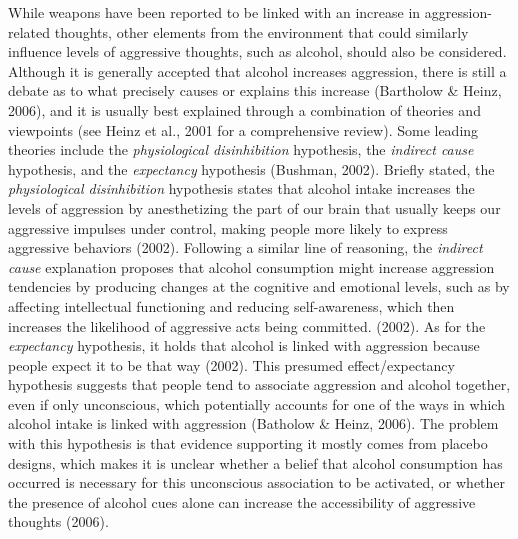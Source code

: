 \documentclass[authordate, serif, review]{jote-article}
\begin{document}
\begin{multicols}{2}
While weapons have been reported to be linked with an increase in aggression-related thoughts, other elements from the environment that could similarly influence levels of aggressive thoughts, such as alcohol, should also be considered. Although it is generally accepted that alcohol increases aggression, there is still a debate as to what precisely causes or explains this increase (Bartholow \& Heinz, 2006), and it is usually best explained through a combination of theories and viewpoints (see Heinz et al., 2001 for a comprehensive review). Some leading theories include the \textit{physiological disinhibition} hypothesis, the \textit{indirect cause} hypothesis, and the \textit{expectancy }hypothesis (Bushman, 2002). Briefly stated, the \textit{physiological disinhibition} hypothesis states that alcohol intake increases the levels of aggression by anesthetizing the part of our brain that usually keeps our aggressive impulses under control, making people more likely to express aggressive behaviors (2002). Following a similar line of reasoning, the \textit{indirect cause} explanation proposes that alcohol consumption might increase aggression tendencies by producing changes at the cognitive and emotional levels, such as by affecting intellectual functioning and reducing self-awareness, which then increases the likelihood of aggressive acts being committed. (2002). As for the \textit{expectancy }hypothesis, it holds that alcohol is linked with aggression because people expect it to be that way (2002). This presumed effect/expectancy hypothesis suggests that people tend to associate aggression and alcohol together, even if only unconscious, which potentially accounts for one of the ways in which alcohol intake is linked with aggression (Batholow \& Heinz, 2006). The problem with this hypothesis is that evidence supporting it mostly comes from placebo designs, which makes it is unclear whether a belief that alcohol consumption has occurred is necessary for this unconscious association to be activated, or whether the presence of alcohol cues alone can increase the accessibility of aggressive thoughts (2006). 


\end{multicols}
\end{document}
